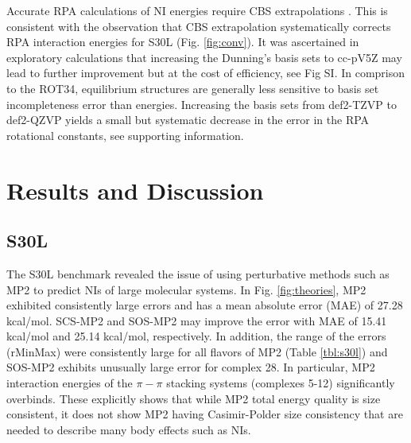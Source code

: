 \documentclass[twoside,twocolumn,9pt]{article}
\begin{document}
Accurate RPA calculations of NI energies require CBS extrapolations
\cite{Eshuis12JChemPhys136p084105}. This is consistent with the
observation that CBS extrapolation systematically corrects RPA
interaction energies for S30L (Fig. \ref{fig:conv}).
It was ascertained in exploratory calculations that increasing the
Dunning's basis sets to cc-pV5Z may lead to further improvement but
at the cost of efficiency, see Fig SI. In comprison to the ROT34,
equilibrium structures are generally less sensitive to basis set
incompleteness error than energies. Increasing the basis sets from
def2-TZVP to def2-QZVP yields a small but systematic decrease in
the error in the RPA rotational constants, see supporting information. %
 

\section{Results and Discussion}

\subsection{S30L}

The S30L benchmark revealed the issue of using perturbative
methods such as MP2 to predict NIs of large molecular systems. In Fig.
\ref{fig:theories}, MP2 exhibited consistently large errors and has a
mean absolute error (MAE) of 27.28 kcal/mol. SCS-MP2 and SOS-MP2 may improve
the error with MAE of 15.41 kcal/mol and 25.14 kcal/mol, respectively.
In addition, the range of the errors (rMinMax) were consistently large for all
flavors of MP2 (Table \ref{tbl:s30l}) and SOS-MP2 exhibits unusually
large error for complex 28. In particular, MP2 interaction
energies of the $\pi-\pi$ stacking systems (complexes 5-12) significantly
overbinds. These explicitly shows that while MP2 total energy quality
is size consistent, it does not show MP2 having Casimir-Polder size
consistency that are needed to describe many body effects such
as NIs.
\end{document}
